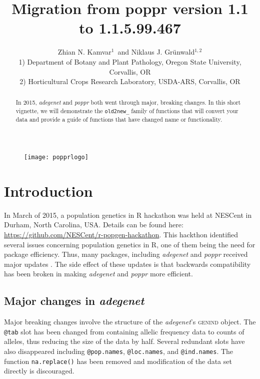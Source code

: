 \documentclass[letterpaper]{article}\usepackage[]{graphicx}\usepackage[]{color}
\title{Migration from poppr version 1.1 to 1.1.5.99.467}
\author{Zhian N. Kamvar$^{1}$\ and Niklaus J. Gr\"unwald$^{1,2}$\\\scriptsize{1)
Department of Botany and Plant Pathology, Oregon State University, Corvallis,
OR}\\\scriptsize{2) Horticultural Crops Research Laboratory, USDA-ARS,
Corvallis, OR}}
\newcommand{\poppr}{\textit{poppr}}
\newcommand{\Poppr}{\textit{Poppr}}
\newcommand{\adegenet}{\textit{adegenet}}
\begin{document}






\maketitle 
\begin{abstract} 
In 2015, \adegenet{} and \poppr{} both went through major, breaking changes.
In this short vignette, we will demonstrate the \texttt{old2new\_} family of
functions that will convert your data and provide a guide of functions that have
changed name or functionality. 
\end{abstract} 

\begin{figure}[b]   
  \centering
  \label{logo}   
  \texttt{[image: popprlogo]} 
\end{figure} 

\newpage 
\begingroup
  \hypersetup{linkcolor=black} 
  \tableofcontents 
\endgroup 

\section{Introduction}

In March of 2015, a population genetics in R hackathon was held at NESCent in 
Durham, North Carolina, USA. Details can be found here: 
\url{https://github.com/NESCent/r-popgen-hackathon}. This hackthon identified 
several issues concerning population genetics in R, one of them being the need
for package efficiency. Thus, many packages, including \adegenet{} and \poppr{}
received major updates \cite{kamvar2015novel}. The side effect of these updates 
is that backwards compatibility has been broken in making \adegenet{} and 
\poppr{} more efficient.

\subsection{Major changes in \adegenet{}}

Major breaking changes involve the structure of the \adegenet{}'s \textsc{genind}
object. The \texttt{@tab} slot has been changed from containing allelic frequency
data to counts of alleles, thus reducing the size of the data by half. Several
redundant slots have also disappeared including \texttt{@pop.names}, 
\texttt{@loc.names}, and \texttt{@ind.names}. The function \texttt{na.replace()}
has been removed and modification of the data set directly is discouraged. 
\end{document}
